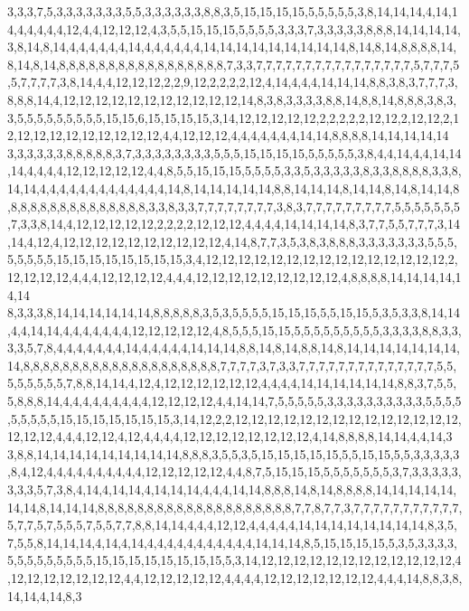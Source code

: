3,3,3,7,5,3,3,3,3,3,3,3,5,5,3,3,3,3,3,3,8,8,3,5,15,15,15,15,5,5,5,5,5,3,8,14,14,14,4,14,14,4,4,4,4,4,12,4,4,12,12,12,4,3,5,5,15,15,15,5,5,5,5,3,3,3,7,3,3,3,3,3,8,8,8,14,14,14,14,3,8,14,8,14,4,4,4,4,4,4,14,4,4,4,4,4,4,14,14,14,14,14,14,14,14,14,8,14,8,14,8,8,8,8,14,8,14,8,14,8,8,8,8,8,8,8,8,8,8,8,8,8,8,8,8,8,7,3,3,7,7,7,7,7,7,7,7,7,7,7,7,7,7,7,7,5,7,7,7,5,5,7,7,7,7,3,8,14,4,4,12,12,12,2,2,9,12,2,2,2,2,12,4,14,4,4,4,14,14,14,8,8,3,8,3,7,7,7,3,8,8,8,14,4,12,12,12,12,12,12,12,12,12,12,12,14,8,3,8,3,3,3,3,8,8,14,8,8,14,8,8,8,3,8,3,3,5,5,5,5,5,5,5,5,5,15,15,6,15,15,15,15,3,14,12,12,12,12,12,2,2,2,2,2,12,12,2,12,12,2,12,12,12,12,12,12,12,12,12,12,4,4,12,12,12,4,4,4,4,4,4,4,14,14,8,8,8,8,14,14,14,14,14
3,3,3,3,3,3,8,8,8,8,8,3,7,3,3,3,3,3,3,3,3,5,5,5,15,15,15,15,5,5,5,5,5,3,8,4,4,14,4,4,14,14,14,4,4,4,4,12,12,12,12,12,4,4,8,5,5,15,15,15,5,5,5,5,3,3,5,3,3,3,3,3,8,3,3,8,8,8,8,3,3,8,14,14,4,4,4,4,4,4,4,4,4,4,4,4,4,14,8,14,14,14,14,14,8,8,14,14,14,8,14,14,8,14,8,14,14,8,8,8,8,8,8,8,8,8,8,8,8,8,8,8,3,3,8,3,3,7,7,7,7,7,7,7,7,3,8,3,7,7,7,7,7,7,7,7,7,5,5,5,5,5,5,5,7,3,3,8,14,4,12,12,12,12,12,2,2,2,2,12,12,12,4,4,4,4,14,14,14,14,8,3,7,7,5,5,7,7,7,3,14,14,4,12,4,12,12,12,12,12,12,12,12,12,12,4,14,8,7,7,3,5,3,8,3,8,8,8,3,3,3,3,3,3,3,5,5,5,5,5,5,5,5,15,15,15,15,15,15,15,15,3,4,12,12,12,12,12,12,12,12,12,12,12,12,12,12,12,2,12,12,12,12,4,4,4,12,12,12,12,4,4,4,12,12,12,12,12,12,12,12,12,4,8,8,8,8,14,14,14,14,14,14
8,3,3,3,8,14,14,14,14,14,14,8,8,8,8,8,3,5,3,5,5,5,5,15,15,15,5,5,15,15,5,3,5,3,3,8,14,14,4,4,14,14,4,4,4,4,4,4,4,12,12,12,12,12,4,8,5,5,5,15,15,5,5,5,5,5,5,5,5,5,3,3,3,3,8,8,3,3,3,3,5,7,8,4,4,4,4,4,4,4,14,4,4,4,4,4,14,14,14,8,8,14,8,14,8,8,14,8,14,14,14,14,14,14,14,14,8,8,8,8,8,8,8,8,8,8,8,8,8,8,8,8,8,8,8,8,7,7,7,7,3,7,3,3,7,7,7,7,7,7,7,7,7,7,7,7,7,7,5,5,5,5,5,5,5,5,7,8,8,14,14,4,12,4,12,12,12,12,12,12,4,4,4,4,14,14,14,14,14,14,8,8,3,7,5,5,5,8,8,8,14,4,4,4,4,4,4,4,4,4,12,12,12,12,4,4,14,14,7,5,5,5,5,5,3,3,3,3,3,3,3,3,3,3,5,5,5,5,5,5,5,5,5,15,15,15,15,15,15,15,3,14,12,2,2,12,12,12,12,12,12,12,12,12,12,12,12,12,12,12,12,12,4,4,4,12,12,4,12,4,4,4,4,12,12,12,12,12,12,12,12,4,14,8,8,8,8,14,14,4,4,14,3
3,8,8,14,14,14,14,14,14,14,14,14,8,8,8,3,5,5,3,5,15,15,15,15,15,5,5,15,15,5,5,3,3,3,3,3,8,4,12,4,4,4,4,4,4,4,4,4,4,12,12,12,12,12,4,4,8,7,5,15,15,15,5,5,5,5,5,5,5,3,7,3,3,3,3,3,3,3,3,5,7,3,8,4,14,4,14,14,4,14,14,14,4,4,4,14,14,8,8,8,14,8,14,8,8,8,8,14,14,14,14,14,14,14,8,14,14,14,8,8,8,8,8,8,8,8,8,8,8,8,8,8,8,8,8,8,8,8,7,7,8,7,7,3,7,7,7,7,7,7,7,7,7,7,7,5,7,7,5,7,5,5,5,7,5,5,7,7,8,8,14,14,4,4,4,12,12,4,4,4,4,4,14,14,14,14,14,14,14,14,8,3,5,7,5,5,8,14,14,14,4,14,4,14,4,4,4,4,4,4,4,4,4,4,4,14,14,14,8,5,15,15,15,15,5,3,5,3,3,3,3,5,5,5,5,5,5,5,5,5,15,15,15,15,15,15,15,15,5,3,14,12,12,12,12,12,12,12,12,12,12,12,12,4,12,12,12,12,12,12,12,4,4,12,12,12,12,12,4,4,4,4,12,12,12,12,12,12,12,4,4,4,14,8,8,3,8,14,14,4,14,8,3
